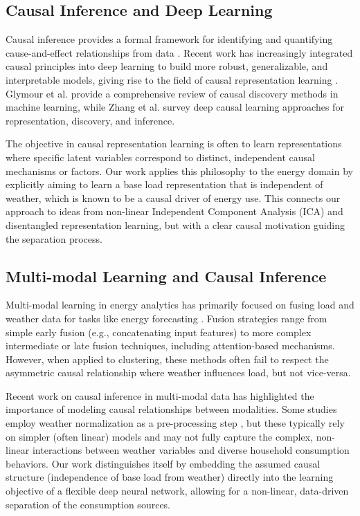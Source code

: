 \documentclass[journal]{IEEEtran}
\begin{document}
\subsection{Causal Inference and Deep Learning}
Causal inference provides a formal framework for identifying and quantifying cause-and-effect relationships from data \cite{pearl2009causality}. Recent work has increasingly integrated causal principles into deep learning to build more robust, generalizable, and interpretable models, giving rise to the field of causal representation learning \cite{causal_representation_learning, scholkopf2021toward}. Glymour et al. \cite{causal_discovery_recent} provide a comprehensive review of causal discovery methods in machine learning, while Zhang et al. \cite{deep_causal_learning} survey deep causal learning approaches for representation, discovery, and inference.

The objective in causal representation learning is often to learn representations where specific latent variables correspond to distinct, independent causal mechanisms or factors. Our work applies this philosophy to the energy domain by explicitly aiming to learn a base load representation that is independent of weather, which is known to be a causal driver of energy use. This connects our approach to ideas from non-linear Independent Component Analysis (ICA) \cite{hyvarinen2000independent} and disentangled representation learning, but with a clear causal motivation guiding the separation process.

\subsection{Multi-modal Learning and Causal Inference}
Multi-modal learning in energy analytics has primarily focused on fusing load and weather data for tasks like energy forecasting \cite{energy_forecasting_survey, weather_energy_recent}. Fusion strategies range from simple early fusion (e.g., concatenating input features) to more complex intermediate or late fusion techniques, including attention-based mechanisms. However, when applied to clustering, these methods often fail to respect the asymmetric causal relationship where weather influences load, but not vice-versa.

Recent work on causal inference in multi-modal data \cite{multi_modal_causal} has highlighted the importance of modeling causal relationships between modalities. Some studies employ weather normalization as a pre-processing step \cite{weather_normalization_energy}, but these typically rely on simpler (often linear) models and may not fully capture the complex, non-linear interactions between weather variables and diverse household consumption behaviors. Our work distinguishes itself by embedding the assumed causal structure (independence of base load from weather) directly into the learning objective of a flexible deep neural network, allowing for a non-linear, data-driven separation of the consumption sources.
\end{document}
